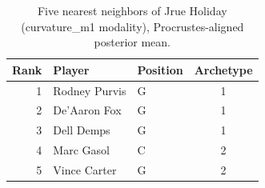 \begin{table}[htbp]
  \centering\small
  \begin{tabular}{rllc}
    \toprule
    Rank & Player & Position & Archetype \\
    \midrule
    1 & Rodney Purvis & G & 1 \\
    2 & De'Aaron Fox & G & 1 \\
    3 & Dell Demps & G & 1 \\
    4 & Marc Gasol & C & 2 \\
    5 & Vince Carter & G & 2 \\
    \bottomrule
  \end{tabular}
  \caption{Five nearest neighbors of Jrue Holiday (curvature_m1 modality), Procrustes-aligned posterior mean.}
  \label{tab:Jrue_Holiday_neighbors_curvature_m1}
\end{table}

